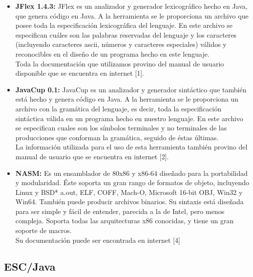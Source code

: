 \documentclass[11pt, spanish]{report}
\begin{document}
\begin{itemize}
  \item \textbf{JFlex 1.4.3:}    
    JFlex es un analizador y generador lexicogr\'afico hecho en Java, que genera c\'odigo en Java. A la herramienta se le proporciona un archivo que posee toda la especificaci\'on 
    lexicogr\'afica del lenguaje. En este archivo se especifican cu\'ales son las palabras reservadas del lenguaje y los caracteres (incluyendo caracteres ascii, n\'umeros y 
    caracteres especiales) v\'alidos y reconocibles en el dise\~no de un programa hecho en este lenguaje.\\

    Toda la documentaci\'on que utilizamos provino del manual de usuario disponible que se encuentra en internet [1].\\
  \item \textbf{JavaCup 0.1:}
    JavaCup es un analizador y generador sint\'actico que tambi\'en est\'a hecho y genera c\'odigo en Java. A la herramienta se le proporciona un archivo con la gram\'atica
    del lenguaje, es decir, toda la especificaci\'on sint\'actica v\'alida en un programa hecho en nuestro lenguaje. En este archivo se especifican cuales son los s\'imbolos
    terminales y no terminales de las producciones que conforman la gram\'atica, seguido de \'estas \'ultimas.\\

    La informaci\'on utilizada para el uso de esta herramienta tambi\'en provino del manual de usuario que se encuentra en internet [2].\\
  \item \textbf{NASM:}
    Es un ensamblador de 80x86 y x86-64 dise\~nado para la portabilidad y modularidad. \'Este soporta un gran rango de formatos de objeto, incluyendo Linux y BSD* a.out, ELF, 
    COFF, Mach-O, Microsoft 16-bit OBJ, Win32 y Win64. Tambi\'en puede producir archivos binarios. Su sintaxis est\'a dise\~nada para ser simple y f\'acil de entender, parecida 
    a la de Intel, pero menos compleja. Soporta todas las arquitecturas x86 conocidas, y tiene un gran soporte de macros.\\

    Su documentaci\'on puede ser encontrada en internet [4]
\end{itemize}

\subsection{ESC/Java}
\end{document}

